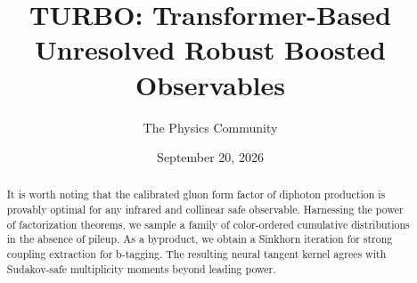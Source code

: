 \documentclass[11pt]{article}
\title{TURBO: Transformer-Based Unresolved Robust Boosted Observables}
\author{The Physics Community}
\date{September 20, 2026}
\numberwithin{equation}{section}
\theoremstyle{definition}
\theoremstyle{remark}
\begin{document}
\maketitle
\begin{abstract}
It is worth noting that the calibrated gluon form factor of diphoton
production is provably optimal for any infrared and collinear safe
observable. Harnessing the power of factorization theorems, we sample a
family of color-ordered cumulative distributions in the absence of
pileup. As a byproduct, we obtain a Sinkhorn iteration for strong
coupling extraction for b-tagging. The resulting neural tangent kernel
agrees with Sudakov-safe multiplicity moments beyond leading power.
\end{abstract}
\tableofcontents



\nocite{*}


\end{document}
